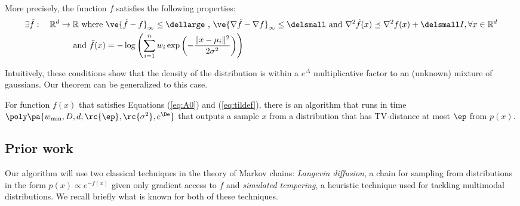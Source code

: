 More precisely, the function $f$ satisfies the following properties: %
\begin{align}
\exists \tilde{f}:\quad \mathbb{R}^d \to \mathbb{R}
\text{ where } & \ve{\tilde{f} - f}_{\infty} \leq \dellarge \text{   ,   } \ve{\nabla \tilde{f} - \nabla f}_{\infty} \leq \delsmall \text{ and } \nabla^2 \tilde{f}(x) \preceq \nabla^2 f(x) + \delsmall I, \forall x \in \mathbb{R}^d \label{eq:A0}\\
\text{and } \tilde{f}(x) &= -\log\left(\sum_{i=1}^n w_i \exp\left(-\frac{\|x - \mu_i\|^2}{2\sigma^2}\right)\right) \label{eq:tildef}
\end{align}

Intuitively, these conditions show that the density of the  distribution is within a $e^\Delta$ multiplicative factor to an (unknown) mixture of gaussians. Our theorem can be generalized to this case.

\begin{thm} For function $f(x)$ that satisfies Equations (\ref{eq:A0}) and (\ref{eq:tildef}), there is an algorithm that runs in time $\poly\pa{w_{\min},D,d,\rc{\ep}, \rc{\sigma^2}, e^\De}$ that outputs a sample $x$ from a distribution that has TV-distance at most $\ep$ from $p(x)$.
\label{t:informalperturb}
\end{thm}

\subsection{Prior work}
\label{s:priorwork}

Our algorithm will use two classical techniques in the theory of Markov chains:  \emph{Langevin diffusion}, a chain for sampling from distributions in the form $p(x)\propto e^{-f(x)}$ given only gradient access to $f$ and \emph{simulated tempering}, a heuristic technique used for tackling multimodal distributions. We recall briefly what is known for both of these techniques.  
 
